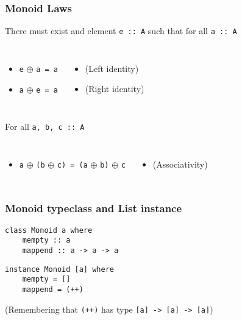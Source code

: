 \documentclass{beamer}
\begin{document}
\begin{frame}[fragile]
    \frametitle {Monoid Laws}

There must exist and element \verb?e :: A? such that for all \verb?a :: A?
\begin{columns}
\begin{itemize}
\item \verb?e? $\oplus$ \verb?a = a?
\item \verb?a? $\oplus$ \verb?e = a?
\end{itemize}
\begin{itemize}
\item[] (Left identity)
\item[] (Right identity)
\end{itemize}
\end{columns}

\vspace{10pt}

For all \verb?a, b, c :: A?
\begin{columns}
\begin{itemize}
\item \verb?a? $\oplus$ \verb?(b? $\oplus$ \verb?c) = (a? $\oplus$ \verb?b)? $\oplus$ \verb?c?
\end{itemize}
\begin{itemize}
\item[] (Associativity)
\end{itemize}
\end{columns}

\end{frame}

\begin{frame}[fragile]
    \frametitle {Monoid typeclass and List instance}

\begin{verbatim}
class Monoid a where
    mempty :: a
    mappend :: a -> a -> a
\end{verbatim}

\begin{verbatim}
instance Monoid [a] where
    mempty = []
    mappend = (++)
\end{verbatim}

(Remembering that \verb?(++)? has type \verb?[a] -> [a] -> [a]?)

\end{frame}
\end{document}
